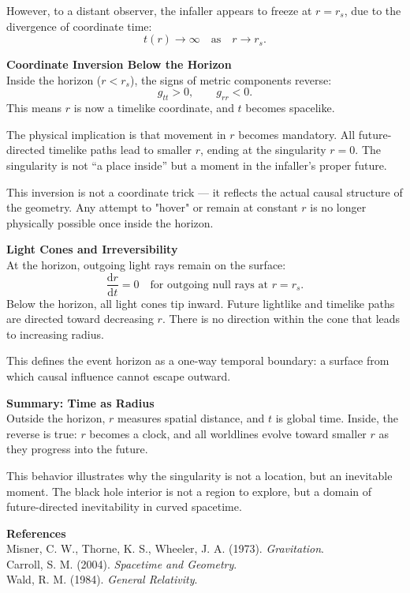 \begin{technical}
However, to a distant observer, the infaller appears to freeze at \(r = r_s\), due to the divergence of coordinate time:
\[
t(r) \to \infty \quad \text{as} \quad r \to r_s.
\]

\vspace{0.7em}
\noindent\textbf{Coordinate Inversion Below the Horizon}\\[0.5em]
Inside the horizon (\(r < r_s\)), the signs of metric components reverse:
\[
g_{tt} > 0, \qquad g_{rr} < 0.
\]
This means \(r\) is now a timelike coordinate, and \(t\) becomes spacelike.

The physical implication is that movement in \(r\) becomes mandatory. All future-directed timelike paths lead to smaller \(r\), ending at the singularity \(r = 0\). The singularity is not “a place inside” but a moment in the infaller’s proper future.

This inversion is not a coordinate trick — it reflects the actual causal structure of the geometry. Any attempt to "hover" or remain at constant \(r\) is no longer physically possible once inside the horizon.

\vspace{0.7em}
\noindent\textbf{Light Cones and Irreversibility}\\[0.5em]
At the horizon, outgoing light rays remain on the surface:
\[
\frac{\mathrm{d}r}{\mathrm{d}t} = 0 \quad \text{for outgoing null rays at } r = r_s.
\]
Below the horizon, all light cones tip inward. Future lightlike and timelike paths are directed toward decreasing \(r\). There is no direction within the cone that leads to increasing radius.

This defines the event horizon as a one-way temporal boundary: a surface from which causal influence cannot escape outward.

\vspace{0.7em}
\noindent\textbf{Summary: Time as Radius}\\[0.5em]
Outside the horizon, \(r\) measures spatial distance, and \(t\) is global time. Inside, the reverse is true: \(r\) becomes a clock, and all worldlines evolve toward smaller \(r\) as they progress into the future.

This behavior illustrates why the singularity is not a location, but an inevitable moment. The black hole interior is not a region to explore, but a domain of future-directed inevitability in curved spacetime.

\vspace{0.7em}
\noindent\textbf{References}\\
Misner, C. W., Thorne, K. S., Wheeler, J. A. (1973). \textit{Gravitation}.\\
Carroll, S. M. (2004). \textit{Spacetime and Geometry}.\\
Wald, R. M. (1984). \textit{General Relativity}.
\end{technical}
